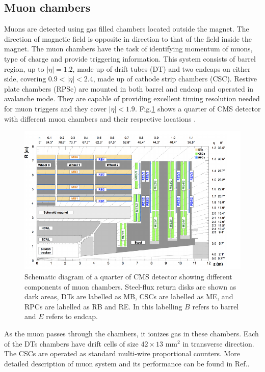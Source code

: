 \subsection{Muon chambers}
Muons are detected using gas filled chambers located outside the magnet. The direction of magnetic field is opposite in direction to 
that of the field inside the magnet. The muon chambers have the task of identifying momentum of muons, type of charge and provide 
triggering information. This system consists of barrel region, up to $|\eta| = 1.2$, made up of drift tubes (DT) and two endcaps on either 
side, covering $0.9 < |\eta| < 2.4$, made up of cathode strip chambers (CSC). Restive plate chambers (RPSc) are mounted in both barrel and 
endcap and operated in avalanche mode. They are capable of providing excellent timing resolution needed for muon triggers and they cover 
$|\eta| < 1.9$. Fig.\ref{fig:Muon_chambers} shows a quarter of CMS detector with different muon chambers and their respective locations 
\cite{Sirunyan:2018fpa}.
\begin{figure}[h!]
\centering
\includegraphics[width=0.95\linewidth]{../Figures/Chap2/Muon_chambers}
\captionsetup{width=.95\linewidth}
\caption[Muon chambers]{Schematic diagram of a quarter of CMS detector showing different components of muon chambers. Steel-flux return disks are shown as dark areas, DTs are labelled as MB, CSCs are labelled as ME, and RPCs are labelled as RB and RE. In this labelling $B$ refers to barrel and $E$ refers to endcap.}
\label{fig:Muon_chambers}
\end{figure}

As the muon passes through the chambers, it ionizes gas in these chambers. Each of the DTs chambers have drift cells of size $42\times 13$ 
mm$^2$ in transverse direction. The CSCs are operated as standard multi-wire proportional counters. More detailed description of muon 
system and its performance can be found in Ref.\cite{Sirunyan:2018fpa,Chatrchyan:2008aa,Chatrchyan:2013sba}.

